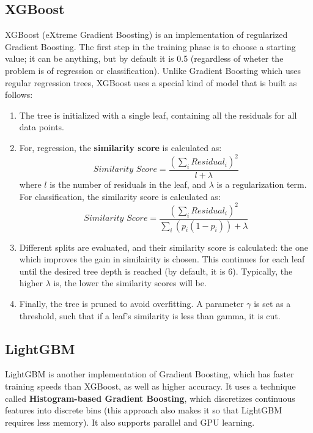 \subsection{XGBoost}

XGBoost (eXtreme Gradient Boosting) is an implementation of regularized Gradient Boosting. The first step in the training phase is to choose a starting value; it can be anything, but by default it is 0.5 (regardless of wheter the problem is of regression or classification). Unlike Gradient Boosting which uses regular regression trees, XGBoost uses a special kind of model that is built as follows:
\begin{enumerate}
    \item The tree is initialized with a single leaf, containing all the residuals for all data points.
    
    \item For, regression, the \textbf{similarity score} is calculated as:
        \begin{equation*}
            \textit{Similarity Score} = \dfrac{(\sum_i \textit{Residual}_i)^2}{l + \lambda}
        \end{equation*}
    where $l$ is the number of residuals in the leaf, and $\lambda$ is a regularization term.
    For classification, the similarity score is calculated as:
    \begin{equation*}
        \textit{Similarity Score} = \dfrac{(\sum_i \textit{Residual}_i)^2}{\sum_i(p_i (1-p_i)) + \lambda}
    \end{equation*}

    \item Different splits are evaluated, and their similarity score is calculated: the one which improves the gain in similairity is chosen. This continues for each leaf until the desired tree depth is reached (by default, it is 6). Typically, the higher $\lambda$ is, the lower the similarity scores will be.
    
    \item Finally, the tree is pruned to avoid overfitting. A parameter $\gamma$ is set as a threshold, such that if a leaf's similarity is less than gamma, it is cut.
\end{enumerate}

\subsection{LightGBM}

LightGBM is another implementation of Gradient Boosting, which has faster training speeds than XGBoost, as well as higher accuracy. It uses a technique called \textbf{Histogram-based Gradient Boosting}, which discretizes continuous features into discrete bins (this approach also makes it so that LightGBM requires less memory). It also supports parallel and GPU learning.

